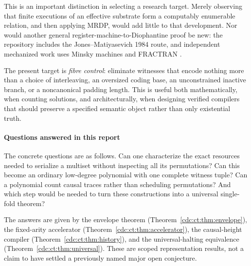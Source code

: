 \documentclass[11pt,a4paper]{article}
\theoremstyle{definition}
\theoremstyle{remark}
\begin{document}
This is an important distinction in selecting a research target. Merely observing that finite executions of an effective substrate form a computably enumerable relation, and then applying MRDP, would add little to that development. Nor would another general register-machine-to-Diophantine proof be new: the repository includes the Jones--Matiyasevich 1984 route, and independent mechanized work uses Minsky machines and FRACTRAN \cite{repo-h10,jm1984,lf2022}.

The present target is \emph{fibre control}: eliminate witnesses that encode nothing more than a choice of interleaving, an oversized coding base, an unconstrained inactive branch, or a noncanonical padding length. This is useful both mathematically, when counting solutions, and architecturally, when designing verified compilers that should preserve a specified semantic object rather than only existential truth.


\paragraph{Questions answered in this report}
The concrete questions are as follows. Can one characterize the exact resources needed to serialize a multiset without inspecting all its permutations? Can this become an ordinary low-degree polynomial with one complete witness tuple? Can a polynomial count causal traces rather than scheduling permutations? And which step would be needed to turn these constructions into a universal single-fold theorem?

The answers are given by the envelope theorem (Theorem~\ref{cdc:ct:thm:envelope}), the fixed-arity accelerator (Theorem~\ref{cdc:ct:thm:accelerator}), the causal-height compiler (Theorem~\ref{cdc:ct:thm:history}), and the universal-halting equivalence (Theorem~\ref{cdc:ct:thm:universal}). These are scoped representation results, not a claim to have settled a previously named major open conjecture.
\end{document}
